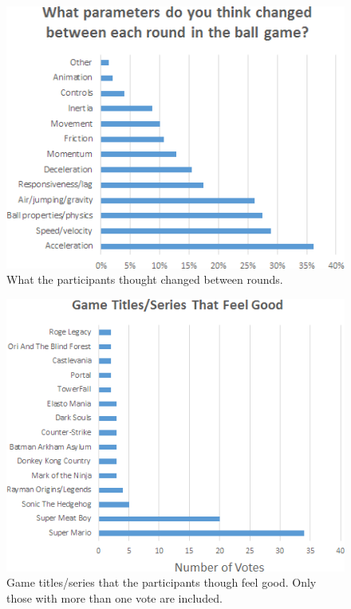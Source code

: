 \begin{figure}[htbp]
\centering
\includegraphics[width=0.9\columnwidth]{Pics/whatChanged}
\caption{What the participants thought changed between rounds.}
\label{fig:whatChanged}
\end{figure}

\begin{figure}[htbp]
\centering
\includegraphics[width=0.9\columnwidth]{Pics/good_games}
\caption{Game titles/series that the participants though feel good. Only those with more than one vote are included.}
\label{fig:good_games}
\end{figure}

